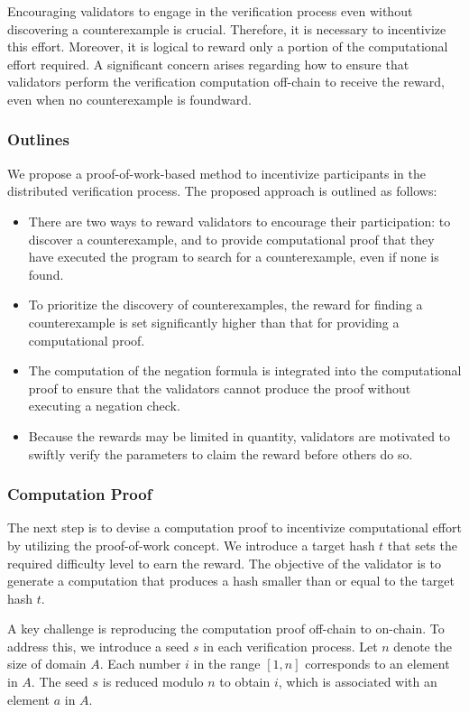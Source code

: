 \documentclass[runningheads]{llncs}
\begin{document}
Encouraging validators to engage in the verification process even without discovering a counterexample is crucial. Therefore, it is necessary to incentivize this effort. Moreover, it is logical to reward only a portion of the computational effort required. A significant concern arises regarding how to ensure that validators perform the verification computation off-chain to receive the reward, even when no counterexample is foundward.

\subsubsection{Outlines}
We propose a proof-of-work-based method to incentivize participants in the distributed verification process. The proposed approach is outlined as follows:

\begin{itemize}
\item There are two ways to reward validators to encourage their participation: to discover a counterexample, and to provide computational proof that they have executed the program to search for a counterexample, even if none is found.
\item To prioritize the discovery of counterexamples, the reward for finding a counterexample is set significantly higher than that for providing a computational proof.
\item The computation of the negation formula is integrated into the computational proof to ensure that the validators cannot produce the proof without executing a negation check.
\item Because the rewards may be limited in quantity, validators are motivated to swiftly verify the parameters to claim the reward before others do so.
\end{itemize}
\subsubsection{Computation Proof}
The next step is to devise a computation proof to incentivize computational effort by utilizing the proof-of-work concept. We introduce a target hash $t$ that sets the required difficulty level to earn the reward. The objective of the validator is to generate a computation that produces a hash smaller than or equal to the target hash $t$.

A key challenge is reproducing the computation proof off-chain to on-chain. To address this, we introduce a seed $s$ in each verification process. Let $n$ denote the size of domain $A$. Each number $i$ in the range $[1, n]$ corresponds to an element in $A$. The seed $s$ is reduced modulo $n$ to obtain $i$, which is associated with an element $a$ in $A$.
\end{document}
